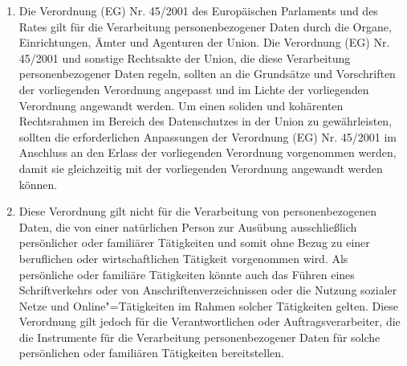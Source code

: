 \begin{enumerate}
   \item Die Verordnung (EG) Nr. 45/2001 des Europäischen Parlaments und des Rates gilt für die Verarbeitung personenbezogener Daten durch die Organe,
    Einrichtungen, Ämter und Agenturen der Union. Die Verordnung (EG) Nr. 45/2001 und sonstige Rechtsakte der Union,
    die diese Verarbeitung personenbezogener Daten regeln, sollten an die Grundsätze und Vorschriften der vorliegenden
    Verordnung angepasst und im Lichte der vorliegenden Verordnung angewandt werden. Um einen soliden und kohärenten
    Rechtsrahmen im Bereich des Datenschutzes in der Union zu gewährleisten, sollten die erforderlichen Anpassungen der
    Verordnung (EG) Nr. 45/2001 im Anschluss an den Erlass der vorliegenden Verordnung vorgenommen werden, damit sie
    gleichzeitig mit der vorliegenden Verordnung angewandt werden können.%
   \label{itm:eg-17}
   

   \item Diese Verordnung gilt nicht für die Verarbeitung von personenbezogenen Daten, die von einer natürlichen Person
    zur Ausübung ausschließlich persönlicher oder familiärer Tätigkeiten und somit ohne Bezug zu einer beruflichen oder
    wirtschaftlichen Tätigkeit vorgenommen wird. Als persönliche oder familiäre Tätigkeiten könnte auch das Führen
    eines Schriftverkehrs oder von Anschriftenverzeichnissen oder die Nutzung sozialer Netze und Online"=Tätigkeiten im
    Rahmen solcher Tätigkeiten gelten. Diese Verordnung gilt jedoch für die Verantwortlichen oder Auftragsverarbeiter,
    die die Instrumente für die Verarbeitung personenbezogener Daten für solche persönlichen oder familiären
    Tätigkeiten bereitstellen.%
   \label{itm:eg-18}
   


\end{enumerate}
